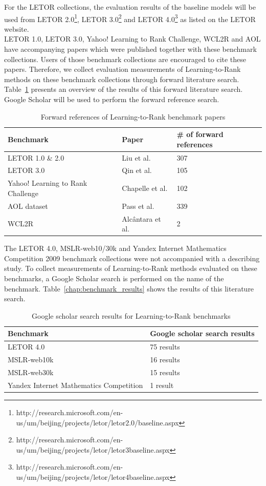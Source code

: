 \documentclass{sig-alternate-2013}
\begin{document}
For the LETOR collections, the evaluation results of the baseline models will be used from LETOR 2.0\footnote{http://research.microsoft.com/en-us/um/beijing/projects/letor/letor2.0/baseline.aspx}, LETOR 3.0\footnote{http://research.microsoft.com/en-us/um/beijing/projects/letor/letor3baseline.aspx} and LETOR 4.0\footnote{http://research.microsoft.com/en-us/um/beijing/projects/letor/letor4baseline.aspx} as listed on the LETOR website.\\

LETOR 1.0, LETOR 3.0, Yahoo! Learning to Rank Challenge, WCL2R and AOL have accompanying papers which were published together with these benchmark collections. Users of those benchmark collections are encouraged to cite these papers. Therefore, we collect evaluation measurements of Learning-to-Rank methods on these benchmark collections through forward literature search. Table~\ref{tbl:ltr_benchmark_forref} presents an overview of the results of this forward literature search. Google Scholar will be used to perform the forward reference search.

\begin{table}[!h]
\begin{tabular}{p{3.2cm}|l|p{1.8cm}}
Benchmark & Paper & \# of forward references \\
\hline
LETOR 1.0 \& 2.0 & Liu et al. \cite{Liu2007b} & 307\\
LETOR 3.0 & Qin et al. \cite{Qin2010} & 105\\
Yahoo! Learning to Rank Challenge & Chapelle et al. \cite{Chapelle2011a} & 102\\
AOL dataset & Pass et al. \cite{Pass2006} & 339\\
WCL2R & Alc{\^a}ntara et al. \cite{Alcantara2010} & 2\\
\end{tabular}
\caption{Forward references of Learning-to-Rank benchmark papers}
\label{tbl:ltr_benchmark_forref}
\end{table}

The LETOR 4.0, MSLR-web10/30k and Yandex Internet Mathematics Competition 2009 benchmark collections were not accompanied with a describing study. To collect measurements of Learning-to-Rank methods evaluated on these benchmarks, a Google Scholar search is performed on the name of the benchmark. Table~\ref{chap:benchmark_results} shows the results of this literature search.

\begin{table}[!h]
\begin{tabular}{p{4.2cm}|p{2.5cm}}
Benchmark & Google scholar search results \\
\hline
LETOR 4.0 & 75 results \\
MSLR-web10k & 16 results \\
MSLR-web30k & 15 results \\
Yandex Internet Mathematics Competition & 1 result \\ 
\end{tabular}
\caption{Google scholar search results for Learning-to-Rank benchmarks}
\label{tbl:ltr_benchmark_searchres}
\end{table}
\end{document}
